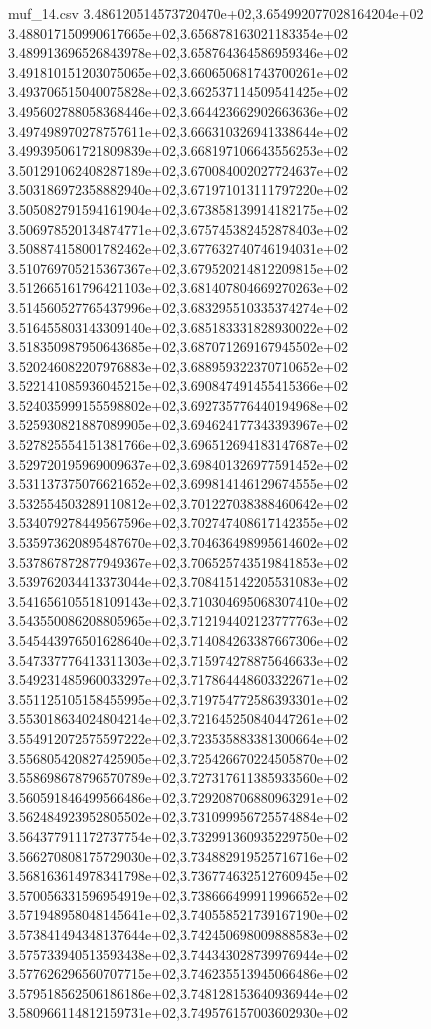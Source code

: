 \begin{filecontents*}{muf_14.csv}
3.486120514573720470e+02,3.654992077028164204e+02
3.488017150990617665e+02,3.656878163021183354e+02
3.489913696526843978e+02,3.658764364586959346e+02
3.491810151203075065e+02,3.660650681743700261e+02
3.493706515040075828e+02,3.662537114509541425e+02
3.495602788058368446e+02,3.664423662902663636e+02
3.497498970278757611e+02,3.666310326941338644e+02
3.499395061721809839e+02,3.668197106643556253e+02
3.501291062408287189e+02,3.670084002027724637e+02
3.503186972358882940e+02,3.671971013111797220e+02
3.505082791594161904e+02,3.673858139914182175e+02
3.506978520134874771e+02,3.675745382452878403e+02
3.508874158001782462e+02,3.677632740746194031e+02
3.510769705215367367e+02,3.679520214812209815e+02
3.512665161796421103e+02,3.681407804669270263e+02
3.514560527765437996e+02,3.683295510335374274e+02
3.516455803143309140e+02,3.685183331828930022e+02
3.518350987950643685e+02,3.687071269167945502e+02
3.520246082207976883e+02,3.688959322370710652e+02
3.522141085936045215e+02,3.690847491455415366e+02
3.524035999155598802e+02,3.692735776440194968e+02
3.525930821887089905e+02,3.694624177343393967e+02
3.527825554151381766e+02,3.696512694183147687e+02
3.529720195969009637e+02,3.698401326977591452e+02
3.531137375076621652e+02,3.699814146129674555e+02
3.532554503289110812e+02,3.701227038388460642e+02
3.534079278449567596e+02,3.702747408617142355e+02
3.535973620895487670e+02,3.704636498995614602e+02
3.537867872877949367e+02,3.706525743519841853e+02
3.539762034413373044e+02,3.708415142205531083e+02
3.541656105518109143e+02,3.710304695068307410e+02
3.543550086208805965e+02,3.712194402123777763e+02
3.545443976501628640e+02,3.714084263387667306e+02
3.547337776413311303e+02,3.715974278875646633e+02
3.549231485960033297e+02,3.717864448603322671e+02
3.551125105158455995e+02,3.719754772586393301e+02
3.553018634024804214e+02,3.721645250840447261e+02
3.554912072575597222e+02,3.723535883381300664e+02
3.556805420827425905e+02,3.725426670224505870e+02
3.558698678796570789e+02,3.727317611385933560e+02
3.560591846499566486e+02,3.729208706880963291e+02
3.562484923952805502e+02,3.731099956725574884e+02
3.564377911172737754e+02,3.732991360935229750e+02
3.566270808175729030e+02,3.734882919525716716e+02
3.568163614978341798e+02,3.736774632512760945e+02
3.570056331596954919e+02,3.738666499911996652e+02
3.571948958048145641e+02,3.740558521739167190e+02
3.573841494348137644e+02,3.742450698009888583e+02
3.575733940513593438e+02,3.744343028739976944e+02
3.577626296560707715e+02,3.746235513945066486e+02
3.579518562506186186e+02,3.748128153640936944e+02
3.580966114812159731e+02,3.749576157003602930e+02

\end{filecontents*}
